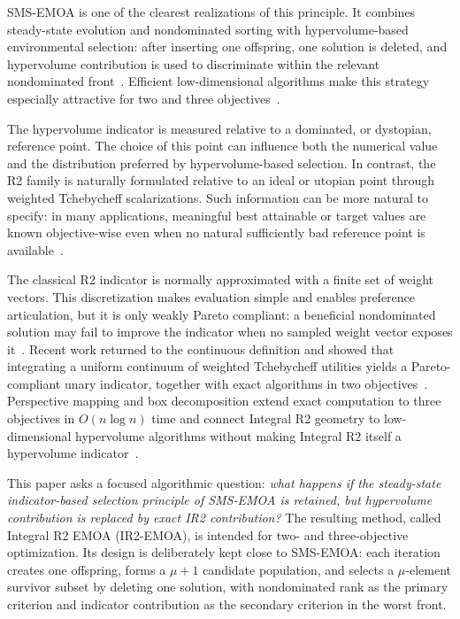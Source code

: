 \documentclass[runningheads]{llncs}
\begin{document}
SMS-EMOA is one of the clearest realizations of this principle. It combines steady-state evolution and nondominated sorting with hypervolume-based environmental selection: after inserting one offspring, one solution is deleted, and hypervolume contribution is used to discriminate within the relevant nondominated front~\cite{BeumeNaujoksEmmerich2007}. Efficient low-dimensional algorithms make this strategy especially attractive for two and three objectives~\cite{EmmerichFonseca2011}.

The hypervolume indicator is measured relative to a dominated, or dystopian, reference point. The choice of this point can influence both the numerical value and the distribution preferred by hypervolume-based selection. In contrast, the R2 family is naturally formulated relative to an ideal or utopian point through weighted Tchebycheff scalarizations. Such information can be more natural to specify: in many applications, meaningful best attainable or target values are known objective-wise even when no natural sufficiently bad reference point is available~\cite{SchaepermeierKerschke2025,Emmerich2026Preference}.

The classical R2 indicator is normally approximated with a finite set of weight vectors. This discretization makes evaluation simple and enables preference articulation, but it is only weakly Pareto compliant: a beneficial nondominated solution may fail to improve the indicator when no sampled weight vector exposes it~\cite{BrockhoffWagnerTrautmann2012,TrautmannWagnerBrockhoff2013}. Recent work returned to the continuous definition and showed that integrating a uniform continuum of weighted Tchebycheff utilities yields a Pareto-compliant unary indicator, together with exact algorithms in two objectives~\cite{SchaepermeierKerschke2025,JaszkiewiczZielniewicz2025}. Perspective mapping and box decomposition extend exact computation to three objectives in $O(n\log n)$ time and connect Integral R2 geometry to low-dimensional hypervolume algorithms without making Integral R2 itself a hypervolume indicator~\cite{Emmerich2026Perspective}.

This paper asks a focused algorithmic question: \emph{what happens if the steady-state indicator-based selection principle of SMS-EMOA is retained, but hypervolume contribution is replaced by exact IR2 contribution?} The resulting method, called Integral R2 EMOA (IR2-EMOA), is intended for two- and three-objective optimization. Its design is deliberately kept close to SMS-EMOA: each iteration creates one offspring, forms a $\mu+1$ candidate population, and selects a $\mu$-element survivor subset by deleting one solution, with nondominated rank as the primary criterion and indicator contribution as the secondary criterion in the worst front.
\end{document}
